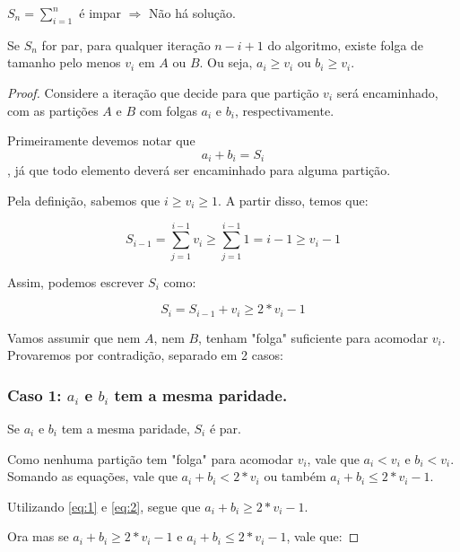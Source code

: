 \begin{prop} \label{particao:odd}
$S_n = \sum_{i = 1}^n$ é impar $\Rightarrow$ Não há solução.
\end{prop}

\begin{prop} \label{particao:proof}
Se $S_n$ for par, para qualquer iteração $n - i + 1$ do algoritmo, existe folga de tamanho pelo menos $v_i$ em $A$ ou $B$. Ou seja, $a_i \geq v_i$ ou $b_i \geq v_i$.
\end{prop}
\begin{proof}

Considere a iteração que decide para que partição $v_i$ será encaminhado, com as partições $A$ e $B$ com folgas $a_i$ e $b_i$, respectivamente.

Primeiramente devemos notar que
\begin{equation} \label{eq:1}
    a_i + b_i = S_i
\end{equation}
, já que todo elemento deverá ser encaminhado para alguma partição.

Pela definição, sabemos que $i \geq v_i \geq 1$. A partir disso, temos que:

$$S_{i - 1} = \sum_{j = 1}^{i - 1} v_i \geq \sum_{j = 1}^{i - 1} 1 = i - 1 \geq v_i - 1$$

Assim, podemos escrever $S_i$ como:

\begin{equation} \label{eq:2}
    S_i = S_{i - 1} + v_i \geq 2*v_i - 1
\end{equation}

Vamos assumir que nem $A$, nem $B$, tenham "folga" suficiente para acomodar $v_i$. Provaremos por contradição, separado em 2 casos:

\subsubsection*{Caso 1: $a_i$ e $b_i$ tem a mesma paridade.}

Se $a_i$ e $b_i$ tem a mesma paridade, $S_i$ é par.

Como nenhuma partição tem "folga" para acomodar $v_i$, vale que $a_i < v_i$ e $b_i < v_i$. Somando as equações, vale que $a_i + b_i < 2*v_i$ ou também $a_i + b_i \leq 2*v_i - 1$.

Utilizando \ref{eq:1} e \ref{eq:2}, segue que $a_i + b_i \geq 2*v_i - 1$.

Ora mas se $a_i + b_i \geq 2*v_i - 1$ e $a_i + b_i \leq 2*v_i - 1$, vale que:


\end{proof}
